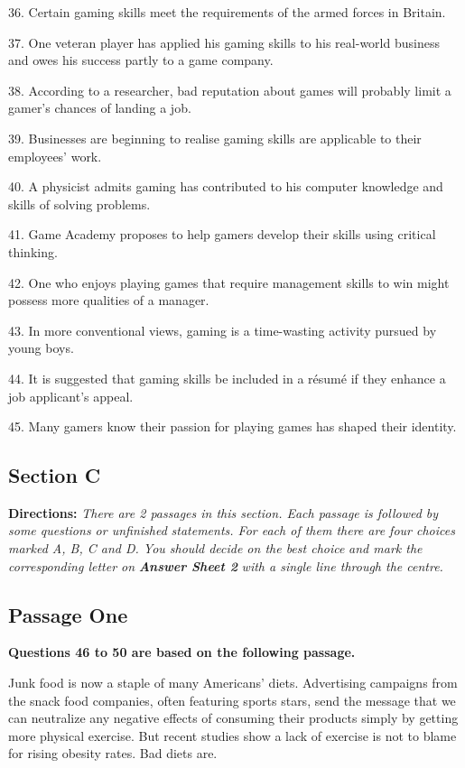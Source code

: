 \documentclass[UTF8,11pt]{ctexart}
\begin{document}
36. Certain gaming skills meet the requirements of the armed forces in Britain.


37. One veteran player has applied his gaming skills to his real-world business and owes his success partly to a game company.


38. According to a researcher, bad reputation about games will probably limit a gamer’s chances of landing a job.


39. Businesses are beginning to realise gaming skills are applicable to their employees’ work.


40. A physicist admits gaming has contributed to his computer knowledge and skills of solving problems.


41. Game Academy proposes to help gamers develop their skills using critical thinking.


42. One who enjoys playing games that require management skills to win might possess more qualities of a manager.


43. In more conventional views, gaming is a time-wasting activity pursued by young boys.


44. It is suggested that gaming skills be included in a résumé if they enhance a job applicant’s appeal.


45. Many gamers know their passion for playing games has shaped their identity.


\subsection*{\textbf{Section C}}


\textbf{Directions: }\textit{There are 2 passages in this section. Each passage is followed by some questions or unfinished} \textit{statements. For each of them there are four choices marked A, B, C and D. You should decide on the best choice} \textit{and mark the corresponding letter on }\textbf{\textit{Answer Sheet 2}}\textit{ with a single line through the centre.}


\subsection*{\textbf{Passage One}}


\textbf{Questions 46 to 50 are based on the following passage.}


Junk food is now a staple of many Americans’ diets. Advertising campaigns from the snack food companies, often featuring sports stars, send the message that we can neutralize any negative effects of consuming their products simply by getting more physical exercise. But recent studies show a lack of exercise is not to blame for rising obesity rates. Bad diets are.
\end{document}
